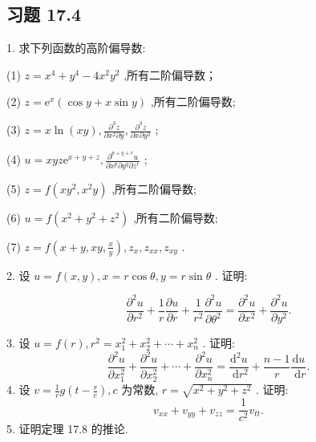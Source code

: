 \subsection{习题 17.4}



\hspace*{2em} 1. 求下列函数的高阶偏导数:

\hspace*{6em} (1) \(z = {x}^{4} + {y}^{4} - 4{x}^{2}{y}^{2}\) ,所有二阶偏导数；

\hspace*{6em} (2) \(z = {\mathrm{e}}^{x}\left( {\cos y + x\sin y}\right)\) ,所有二阶偏导数;

\hspace*{5em} (3) \(z = x\ln \left( {xy}\right) ,\frac{{\partial }^{3}z}{\partial {x}^{2}\partial y},\frac{{\partial }^{3}z}{\partial x\partial {y}^{2}}\) ;

\hspace*{6em} (4) \(u = {xyz}{\mathrm{e}}^{x + y + z},\frac{{\partial }^{p + q + r}u}{\partial {x}^{p}\partial {y}^{q}\partial {z}^{r}}\) ;

\hspace*{6em} (5) \(z = f\left( {x{y}^{2},{x}^{2}y}\right)\) ,所有二阶偏导数;

\hspace*{7em} (6) \(u = f\left( {{x}^{2} + {y}^{2} + {z}^{2}}\right)\) ,所有二阶偏导数;

\hspace*{6em} (7) \(z = f\left( {x + y,{xy},\frac{x}{y}}\right) ,{z}_{x},{z}_{xx},{z}_{xy}\) .

2. 设 \(u = f\left( {x,y}\right) ,x = r\cos \theta ,y = r\sin \theta\) . 证明:




\[
\frac{{\partial }^{2}u}{\partial {r}^{2}} + \frac{1}{r}\frac{\partial u}{\partial r} + \frac{1}{{r}^{2}}\frac{{\partial }^{2}u}{\partial {\theta }^{2}} = \frac{{\partial }^{2}u}{\partial {x}^{2}} + \frac{{\partial }^{2}u}{\partial {y}^{2}}.
\]


\hspace*{4em} 3. 设 \(u = f\left( r\right) ,{r}^{2} = {x}_{1}^{2} + {x}_{2}^{2} + \cdots  + {x}_{n}^{2}\) . 证明:
\[
\frac{{\partial }^{2}u}{\partial {x}_{1}^{2}} + \frac{{\partial }^{2}u}{\partial {x}_{2}^{2}} + \cdots  + \frac{{\partial }^{2}u}{\partial {x}_{n}^{2}} = \frac{{\mathrm{d}}^{2}u}{\mathrm{\;d}{r}^{2}} + \frac{n - 1}{r}\frac{\mathrm{d}u}{\mathrm{\;d}r}.
\]
 4. 设 \(v = \frac{1}{r}g\left( {t - \frac{r}{c}}\right) ,c\) 为常数, \(r = \sqrt{{x}^{2} + {y}^{2} + {z}^{2}}\) . 证明:
\[
{v}_{xx} + {v}_{yy} + {v}_{zz} = \frac{1}{{c}^{2}}{v}_{tt}.
\]
\hspace*{4em} 5. 证明定理 17.8 的推论.

